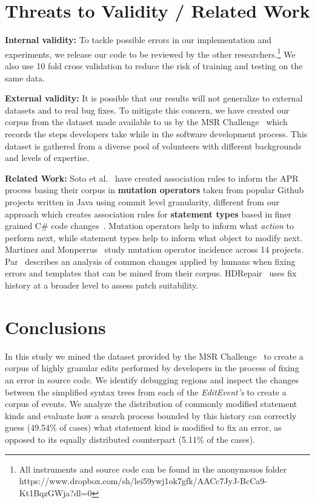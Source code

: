 \documentclass[sigconf]{acmart}
\begin{document}
\section{Threats to Validity / Related Work} \label{threatsVal}

\noindent\textbf{Internal validity:}
To tackle possible errors in our implementation and experiments, we release our code
to be reviewed by the other researchers.\footnote{All instruments
and source code can be found in the anonymouos folder 
https://www.dropbox.com/sh/lei59ywj1ok7gfk/AACc7JyJ-BcCa9-Kt1BqzGWja?dl=0} 
We also use 10 fold cross validation 
to reduce the risk of training and testing on the same data.  

\noindent\textbf{External validity:} 
It is possible 
that our results will not generalize to external datasets and to
real bug fixes. To mitigate this concern, we have created our corpus 
from the dataset made available to us by the MSR Challenge~\cite{msr18challenge}
which records the steps developers take while in the software development process.
This dataset is gathered from a diverse pool of volunteers with different 
backgrounds and levels of expertise.

\noindent\textbf{Related Work:} 
Soto et al.~\cite{Soto18} have created association rules to inform the APR
process basing their corpus in \textbf{mutation operators} taken from popular Github projects
written in Java using commit level granularity, 
different from our approach which creates association rules for \textbf{statement types} 
based in finer grained C\# code changes~\cite{msr18challenge}. Mutation operators help to 
inform what \textit{action} to perform next, while statement types help to inform what
object to modify next. 
Martinez and
Monperrus~\cite{martinez15} study mutation operator incidence across 
14 projects. Par~\cite{kim2013} describes an analysis of common changes
applied by humans when fixing errors and templates that can be mined from
their corpus. HDRepair~\cite{xuan16} 
uses fix history at a broader level
to assess patch suitability.


\section{Conclusions}
\label{conclusions}
In this study we mined the dataset provided by the MSR Challenge~\cite{msr18challenge}
to create a corpus of highly granular edits performed by developers in the process
of fixing an error in source code. We identify debugging
regions and inspect the changes between the simplified 
syntax trees from each
of the \textit{EditEvent's} to create a corpus of 
events.
We analyze the distribution of commonly modified statement kinds and evaluate
how a search process bounded by this history can correctly guess (49.54\% of 
cases) what statement kind is modified to fix an error, as opposed to its
equally distributed counterpart (5.11\% of the cases).
\end{document}
